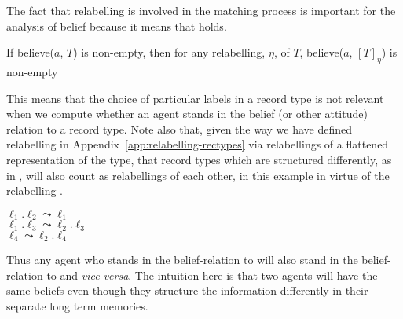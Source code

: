 The fact that
relabelling is involved in the matching process is important for the
analysis of belief because
it means that \nexteg{} holds.
\begin{ex} 
If believe($a$, $T$) is non-empty, then for any relabelling, $\eta$,
of $T$, believe($a$, $[T]_{\eta}$) is non-empty 
\end{ex} 
This means that the choice of particular labels in a record type is
not relevant when we compute whether an agent stands in the belief (or
other attitude)
relation to a record type.  Note also that, given the way we have
defined relabelling in Appendix~\ref{app:relabelling-rectypes} via relabellings
of a flattened representation of the type, that record
types which are structured differently, as in , will also
count as relabellings of each other, in this example in virtue of the relabelling .
\begin{ex} 
\begin{subex} 
 
\item {} 
 
\item {}

\item  $\ell_1.\ell_2\leadsto\ell_1$\\
$\ell_1.\ell_3\leadsto\ell_2.\ell_3$\\
$\ell_4\leadsto\ell_2.\ell_4$
 
\end{subex} 
   
\end{ex} 
Thus any agent who stands in the belief-relation to  will
also stand in the belief-relation to  and \textit{vice
  versa}.  The intuition here is that two agents will have the same
beliefs even though they structure the information differently in
their separate long term memories.


